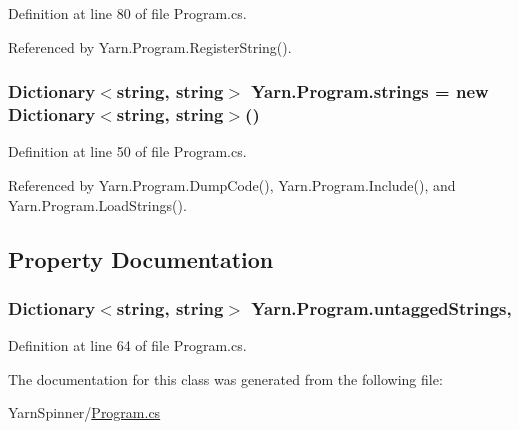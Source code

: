 Definition at line 80 of file Program.\-cs.



Referenced by Yarn.\-Program.\-Register\-String().

\hypertarget{a00140_a59263e00cecfe36d9881b4c30b048f09}{
\subsubsection[{strings}]{\setlength{\rightskip}{0pt plus 5cm}Dictionary$<$string, string$>$ Yarn.\-Program.\-strings = new Dictionary$<$string, string$>$()\hspace{0.3cm}{\ttfamily [package]}}}\label{a00140_a59263e00cecfe36d9881b4c30b048f09}


Definition at line 50 of file Program.\-cs.



Referenced by Yarn.\-Program.\-Dump\-Code(), Yarn.\-Program.\-Include(), and Yarn.\-Program.\-Load\-Strings().



\subsection{Property Documentation}
\hypertarget{a00140_aa8fedbfceaf931d1da3f600eaab6ae87}{
\subsubsection[{untagged\-Strings}]{\setlength{\rightskip}{0pt plus 5cm}Dictionary$<$string, string$>$ Yarn.\-Program.\-untagged\-Strings\hspace{0.3cm}{\ttfamily [get]}, {\ttfamily [package]}}}\label{a00140_aa8fedbfceaf931d1da3f600eaab6ae87}


Definition at line 64 of file Program.\-cs.



The documentation for this class was generated from the following file\-:\begin{DoxyCompactItemize}
\item 
Yarn\-Spinner/\hyperlink{a00292}{Program.\-cs}\end{DoxyCompactItemize}
